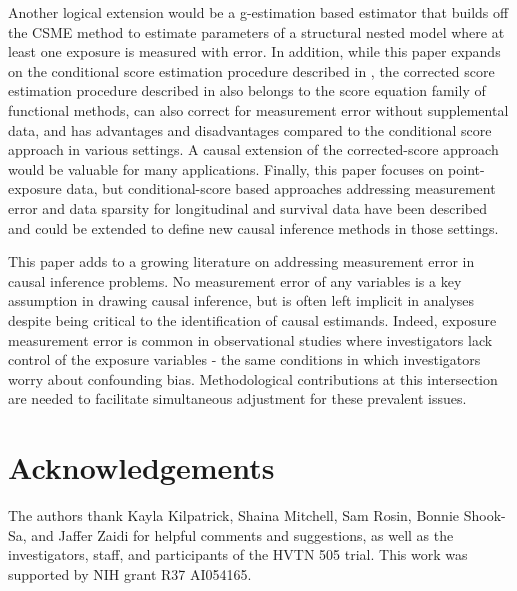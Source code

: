 \documentclass[useAMS,usenatbib,referee]{biom}
\begin{document}
Another logical extension would be a g-estimation based estimator that builds off the CSME method to estimate parameters of a structural nested model where at least one exposure is measured with error. In addition, while this paper expands on the conditional score estimation procedure described in \citet{stefanski1987}, the corrected score estimation procedure described in \citet{nakamura1990} also belongs to the score equation family of functional methods, can also correct for measurement error without supplemental data, and has advantages and disadvantages compared to the conditional score approach in various settings. A causal extension of the corrected-score approach would be valuable for many applications. Finally, this paper focuses on point-exposure data, but conditional-score based approaches addressing measurement error and data sparsity for longitudinal and survival data have been described and could be extended to define new causal inference methods in those settings.

This paper adds to a growing literature on addressing measurement error in causal inference problems. No measurement error of any variables is a key assumption in drawing causal inference, but is often left implicit in analyses despite being critical to the identification of causal estimands. Indeed, exposure measurement error is common in observational studies where investigators lack control of the exposure variables - the same conditions in which investigators worry about confounding bias. Methodological contributions at this intersection are needed to facilitate simultaneous adjustment for these prevalent issues.





\backmatter


\section*{Acknowledgements}

The authors thank Kayla Kilpatrick, Shaina Mitchell, Sam Rosin, Bonnie Shook-Sa, and Jaffer Zaidi for helpful comments and suggestions, as well as the investigators, staff, and participants of the HVTN 505 trial. This work was supported by NIH grant R37 AI054165. \vspace*{-8pt}
\end{document}
